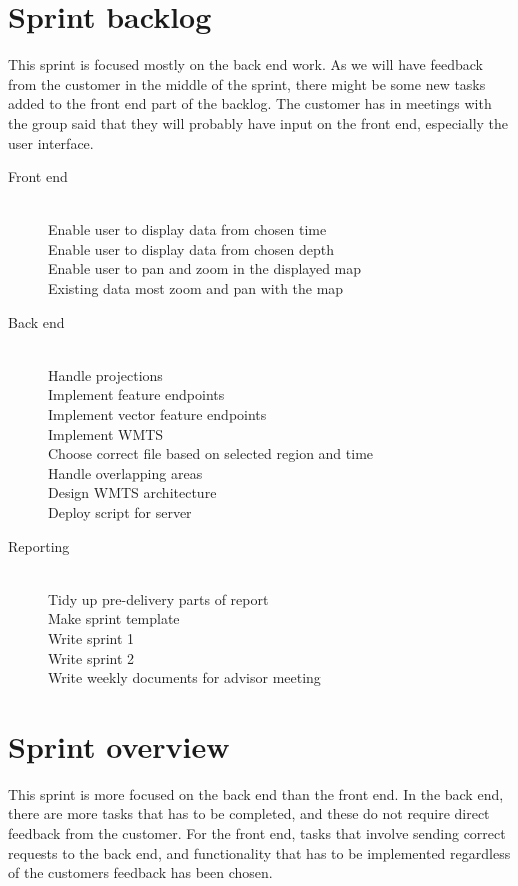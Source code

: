 \documentclass[11pt,a4paper,titlepage,oneside]{report}
\begin{document}
\section{Sprint backlog}
This sprint is focused mostly on the back end work. As we will have feedback from the customer in the middle of the sprint, there might be some new tasks added to the front end part of the backlog. The customer has in meetings with the group said that they will probably have input on the front end, especially the user interface. 

\begin{description}
	\item[Front end] \hfill \\
	Enable user to display data from chosen time \hfill \\
	Enable user to display data from chosen depth \hfill \\
	Enable user to pan and zoom in the displayed map \hfill \\
	Existing data most zoom and pan with the map
	\item[Back end] \hfill \\
	Handle projections \hfill \\
	Implement feature endpoints \hfill \\
	Implement vector feature endpoints \hfill \\
	Implement WMTS \hfill \\
	Choose correct file based on selected region and time \hfill \\
	Handle overlapping areas \hfill \\
	Design WMTS architecture \hfill \\
	Deploy script for server
	\item[Reporting] \hfill \\
	Tidy up pre-delivery parts of report \hfill \\
	Make sprint template \hfill \\
	Write sprint 1 \hfill \\
	Write sprint 2 \hfill \\
	Write weekly documents for advisor meeting
\end{description}

\section{Sprint overview}
This sprint is more focused on the back end than the front end. In the back end, there are more tasks that has to be completed, and these do not require direct feedback from the customer. For the front end, tasks that involve sending correct requests to the back end, and functionality that has to be implemented regardless of the customers feedback has been chosen. 
\end{document}
